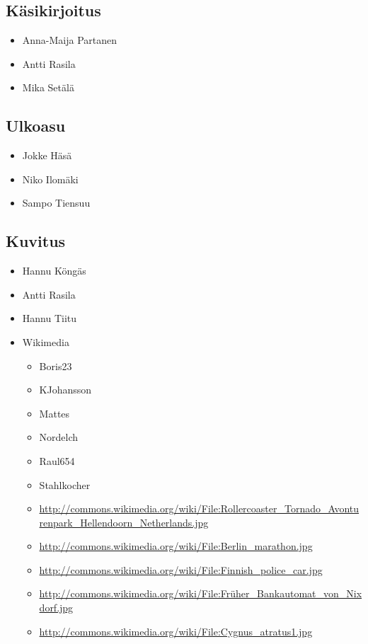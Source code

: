 \subsection*{Käsikirjoitus}
\begin{itemize}
\item Anna-Maija Partanen
\item Antti Rasila
\item Mika Setälä
\end{itemize}

\subsection*{Ulkoasu}
\begin{itemize}
\item Jokke Häsä
\item Niko Ilomäki
\item Sampo Tiensuu
\end{itemize}

\subsection*{Kuvitus}
\begin{itemize}
\item Hannu Köngäs
\item Antti Rasila
\item Hannu Tiitu
\item Wikimedia \begin{itemize}
    \item Boris23
    \item KJohansson
    \item Mattes
    \item Nordelch
    \item Raul654
    \item Stahlkocher
    \item \url{http://commons.wikimedia.org/wiki/File:Rollercoaster_Tornado_Avonturenpark_Hellendoorn_Netherlands.jpg}
    \item \url{http://commons.wikimedia.org/wiki/File:Berlin_marathon.jpg}
    \item \url{http://commons.wikimedia.org/wiki/File:Finnish_police_car.jpg}
    \item \url{http://commons.wikimedia.org/wiki/File:Früher_Bankautomat_von_Nixdorf.jpg}
    \item \url{http://commons.wikimedia.org/wiki/File:Cygnus_atratus1.jpg}
    \end{itemize}
\end{itemize}
